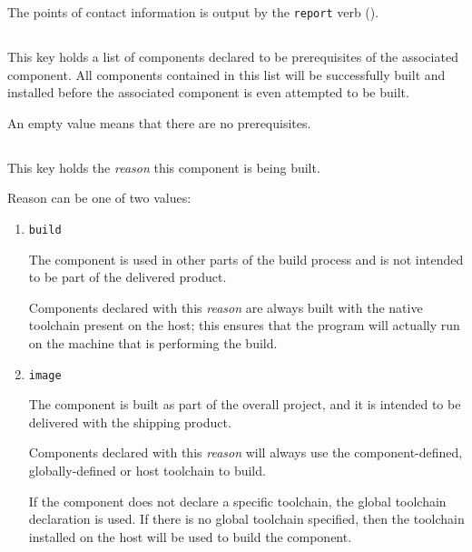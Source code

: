 The points of contact information is output by the \texttt{report}
verb ().


\subsection{}\label{variables:prerequisite}

This key holds a list of components declared to be prerequisites of
the associated component.  All components contained in this list will
be successfully built and installed before the associated component is
even attempted to be built.

An empty value means that there are no prerequisites.


\subsection{}\label{variables:reason}

This key holds the \emph{reason} this component is being built.

Reason can be one of two values:

  \begin{enumerate}
  \item \texttt{build}

    The component is used in other parts of the build process and is
    not intended to be part of the delivered product.

    Components declared with this \emph{reason} are always built with
    the native toolchain present on the host; this ensures that the
    program will actually run on the machine that is performing the
    build.

  \item \texttt{image}

    The component is built as part of the overall project, and it is
    intended to be delivered with the shipping product.

    Components declared with this \emph{reason} will always use the
    component-defined, globally-defined or host toolchain to build.

    If the component does not declare a specific toolchain, the global
    toolchain declaration is used.  If there is no global toolchain
    specified, then the toolchain installed on the host will be used
    to build the component.

  \end{enumerate}


